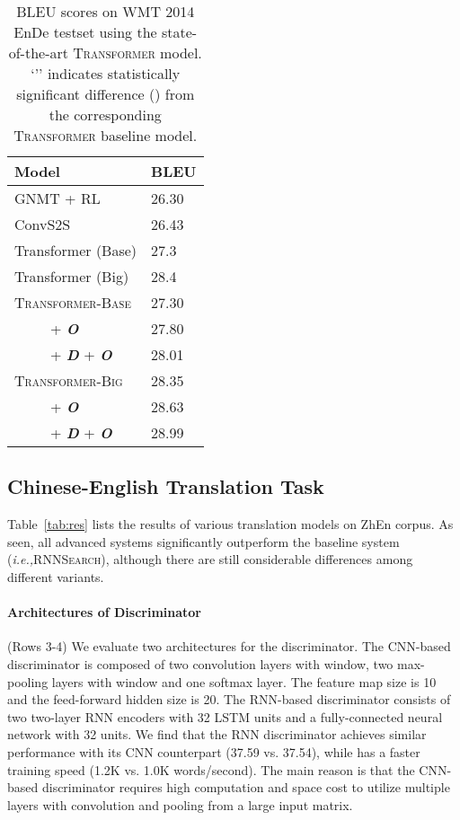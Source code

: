 \documentclass[letterpaper]{article} \usepackage{aaai19}  \usepackage{times}  \usepackage{helvet}  \usepackage{courier}  \usepackage{url}  \usepackage{graphicx}  \frenchspacing  \setlength{\pdfpagewidth}{8.5in}  \setlength{\pdfpageheight}{11in}  \usepackage{amsmath}
\begin{document}
\begin{table}[t]
\centering
\small
\begin{tabular}{l|l}
\hline
{\bf Model}  &   {\bf BLEU}    \\
\hline
GNMT + RL \cite{Wu:2016:arXiv}  &  26.30 \\
ConvS2S \cite{gehring2017convolutional}  & 26.43\\
Transformer (Base) \cite{vaswani2017attention}  & 27.3 \\
Transformer (Big) \cite{vaswani2017attention} & 28.4 \\
\hline
  \textsc{Transformer-Base}    &   27.30 \\
~~~~~+ {\bf \em O} & 27.80 \\
 ~~~~~+ {\bf \em D} + {\bf \em O} & 28.01  \\\cline{1-2}
\textsc{Transformer-Big}    &   28.35 \\
~~~~~+ {\bf \em O} & 28.63 \\
~~~~~+ {\bf \em D} + {\bf \em O} & 28.99  \\
\hline
\end{tabular}
\caption{BLEU scores on WMT 2014 EnDe testset using the state-of-the-art \textsc{Transformer} model. `'' indicates statistically significant difference ()  from the corresponding \textsc{Transformer} baseline model.}
\label{tab:res-wmt-att-en-de} 

\end{table}



\subsection{Chinese-English Translation Task}

Table~\ref{tab:res} lists the results of various translation models on ZhEn corpus. As seen, all advanced systems significantly outperform the baseline system (\emph{i.e.,}\xspace \textsc{RNNSearch}), although there are still considerable differences among different variants.

\paragraph{\bf Architectures of Discriminator} (Rows 3-4)
We evaluate two architectures for the discriminator. The CNN-based discriminator is composed of two convolution layers with  window, two max-pooling layers with  window and one softmax layer. The feature map size is 10 and the feed-forward hidden size is 20. The RNN-based discriminator consists of two two-layer RNN encoders with 32 LSTM units and a fully-connected neural network with 32 units.
We find that the RNN discriminator achieves similar performance with its CNN counterpart (37.59 vs. 37.54), while has a faster training speed (1.2K vs. 1.0K words/second). 
The main reason is that the CNN-based discriminator requires high computation and space cost to utilize multiple layers with convolution and pooling from a large input matrix. 
\end{document}
